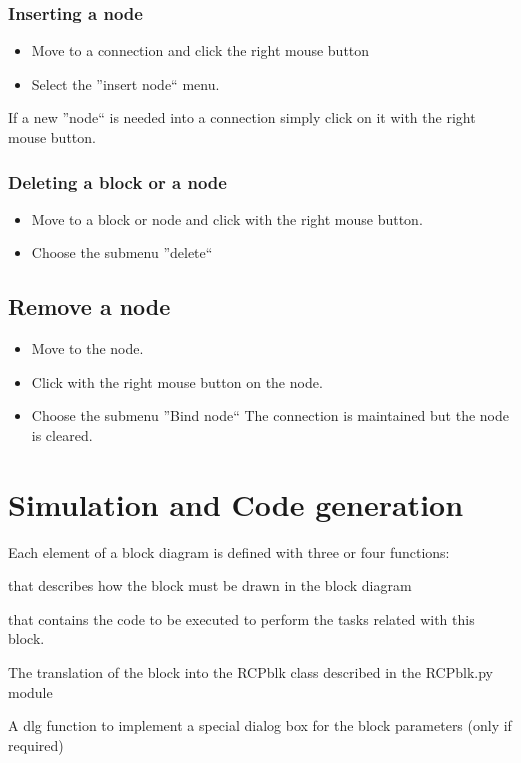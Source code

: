 \subsection{Inserting a node}
\begin{itemize}
\item Move to a connection and click the right mouse button
\item Select the ''insert node`` menu.
\end{itemize}

If a new ''node`` is needed into a connection simply click on it with the right 
mouse button.

\subsection{Deleting a block or a node}
\begin{itemize}
\item Move to a block or node and click with the right mouse button.
\item Choose the submenu ''delete``
\end{itemize}

\section{Remove a node}
\begin{itemize}
\item Move to the node.
\item Click with the right mouse button on the node. 
\item Choose the submenu ''Bind node`` The connection is maintained 
but the node is cleared.
\end{itemize}

\chapter{Simulation and Code generation}

Each element of a block diagram is defined with three or four functions:

\begin{description}
\item [The interface function] that describes how the block must be drawn in 
the block diagram
\item [The Implementation function] that contains the code  to be executed to 
perform the tasks related with this block.
\item The translation of the block into the RCPblk class described in the 
RCPblk.py module
\item A dlg function to implement a special dialog box for the block parameters 
(only if required)
\end{description}

